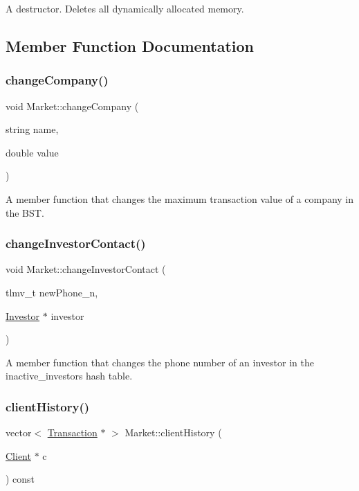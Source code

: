 A destructor. Deletes all dynamically allocated memory. 

\subsection{Member Function Documentation}
\mbox{\label{class_market_a129446c7c106c1a68d3bedf54f1bbc2b}} 
\subsubsection{\texorpdfstring{change\+Company()}{changeCompany()}}
{\footnotesize\ttfamily void Market\+::change\+Company (\begin{DoxyParamCaption}\item[{string}]{name,  }\item[{double}]{value }\end{DoxyParamCaption})}

A member function that changes the maximum transaction value of a company in the B\+ST. \mbox{\label{class_market_a7c2e0ff2535534b9a410437b0496b2a3}} 
\subsubsection{\texorpdfstring{change\+Investor\+Contact()}{changeInvestorContact()}}
{\footnotesize\ttfamily void Market\+::change\+Investor\+Contact (\begin{DoxyParamCaption}\item[{tlmv\+\_\+t}]{new\+Phone\+\_\+n,  }\item[{\hyperlink{class_investor}{Investor} $\ast$}]{investor }\end{DoxyParamCaption})}

A member function that changes the phone number of an investor in the inactive\+\_\+investors hash table. \mbox{\label{class_market_aecf8063cd4ed62c3a74a44960b68eb7e}} 
\subsubsection{\texorpdfstring{client\+History()}{clientHistory()}}
{\footnotesize\ttfamily vector$<$ \hyperlink{class_transaction}{Transaction} $\ast$ $>$ Market\+::client\+History (\begin{DoxyParamCaption}\item[{\hyperlink{class_client}{Client} $\ast$}]{c }\end{DoxyParamCaption}) const}

